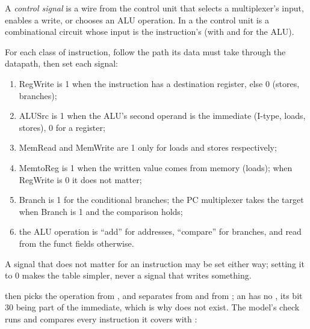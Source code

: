 \begin{definition}\label{def:b2:processor-and-pipelining:control}
A \emph{control signal} is a wire from the control unit that selects a multiplexer's input,
enables a write, or chooses an ALU operation. In a  the control unit is a combinational
circuit whose input is the instruction's  (with  and  for the ALU).
\end{definition}

\begin{method}\label{met:b2:processor-and-pipelining:control-table}
For each class of instruction, follow the path its data must take through the datapath, then set each signal:
\begin{enumerate}
\item RegWrite is 1 when the instruction has a destination register, else 0 (stores, branches);
\item ALUSrc is 1 when the ALU's second operand is the immediate (I-type, loads, stores), 0 for a register;
\item MemRead and MemWrite are 1 only for loads and stores respectively;
\item MemtoReg is 1 when the written value comes from memory (loads); when RegWrite is 0 it does not matter;
\item Branch is 1 for the conditional branches; the PC multiplexer takes the target when Branch is 1 and the
comparison holds;
\item the ALU operation is ``add'' for addresses, ``compare'' for branches, and read from the funct fields otherwise.
\end{enumerate}
A signal that does not matter for an instruction may be set either way; setting it to 0 makes the table simpler,
never a signal that writes something.
\end{method}

\label{lst:b2:processor-and-pipelining:control}

 then picks the operation from , and  separates  from
 and  from ; an  has no , its bit 30 being part of the
immediate, which is why  does not exist. The model's check runs  and compares every
instruction it covers with :

